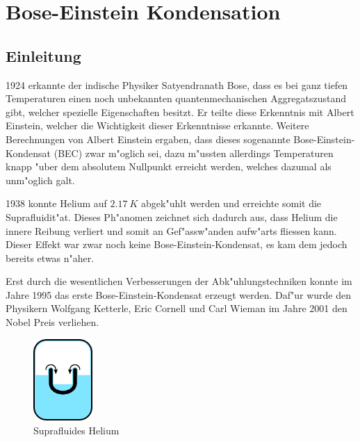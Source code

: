 \chapter{Bose-Einstein Kondensation\label{chapter:bose}}
\begin{refsection}

\section{Einleitung}
1924 erkannte der indische Physiker Satyendranath Bose, dass es bei ganz tiefen Temperaturen einen noch unbekannten quantenmechanischen Aggregatszustand gibt, welcher spezielle Eigenschaften besitzt. Er teilte diese Erkenntnis mit Albert Einstein,  welcher die Wichtigkeit dieser Erkenntnisse erkannte. Weitere Berechnungen von Albert Einstein ergaben, dass dieses sogenannte Bose-Einstein-Kondensat (BEC) zwar m"oglich sei, dazu m"ussten allerdings Temperaturen knapp "uber dem absolutem Nullpunkt erreicht werden, welches dazumal als unm"oglich galt. 

1938 konnte Helium auf $2.17~K$ abgek"uhlt werden und erreichte somit die Suprafluidit"at. Dieses Ph"anomen zeichnet sich dadurch aus, dass Helium die innere Reibung verliert und somit an Gef"assw"anden aufw"arts fliessen kann. Dieser Effekt war zwar noch keine Bose-Einstein-Kondensat, es kam dem jedoch bereits etwas n"aher. \cite{bose:WikiSuprafluid}

Erst durch die wesentlichen Verbesserungen der Abk"uhlungstechniken konnte im Jahre 1995 das erste Bose-Einstein-Kondensat erzeugt werden. Daf"ur wurde den Physikern Wolfgang Ketterle, Eric Cornell und Carl Wieman im Jahre 2001 den Nobel Preis verliehen. 

\begin{figure}
	\centering
	\includegraphics[width = 0.2\textwidth]{./bose/helium.png} 
	\caption[Suprafluides Helium]{Suprafluides Helium \cite{bose:WikiSuprafluid}}
	\label{fig:Helium}
\end{figure}


\end{refsection}

